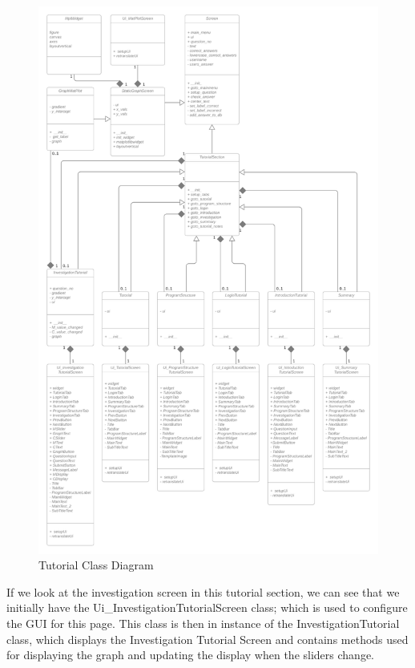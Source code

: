 \documentclass{article}
\begin{document}
\clearpage
\begin{figure}[ht]
    \centering
    \captionsetup{justification=centering}
    \includegraphics[scale=0.113]{tutorial-class-diagram}
    \caption{Tutorial Class Diagram}
\end{figure}
\clearpage

If we look at the investigation screen in this tutorial section, we can see that we initially have the Ui\_InvestigationTutorialScreen class; which is used to configure the GUI for this page. This class is then in instance of the InvestigationTutorial class, which displays the Investigation Tutorial Screen and contains methods used for displaying the graph and updating the display when the sliders change.
\end{document}
